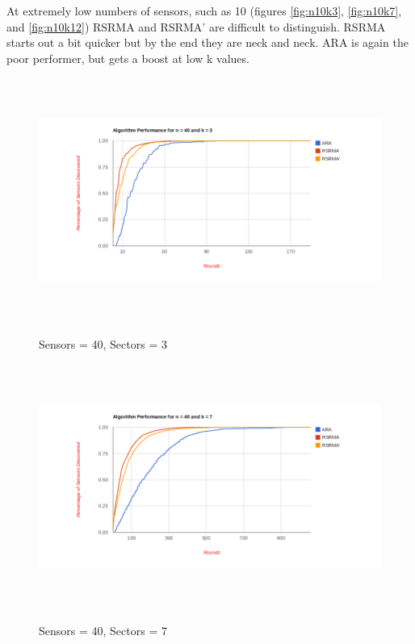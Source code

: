 At extremely low numbers of sensors, such as 10 (figures \ref{fig:n10k3}, \ref{fig:n10k7}, and \ref{fig:n10k12}) RSRMA and RSRMA' are difficult to distinguish. RSRMA starts out a bit quicker but by the end they are neck and neck. ARA is again the poor performer, but gets a boost at low k values.

\begin{figure}[ht]
\caption{Sensors = 40, Sectors = 3}
\includegraphics[height = 8cm]{pics/graph40k3.png}\\[0.5cm]    
\label{fig:n40k3}
\end{figure}

\begin{figure}[ht]
\caption{Sensors = 40, Sectors = 7}
\includegraphics[height = 8cm]{pics/graph40k7.png}\\[0.5cm]   
\label{fig:n40k7} 
\end{figure}

